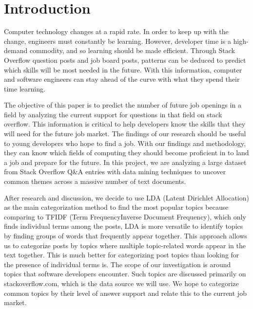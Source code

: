 \section{Introduction}

Computer technology changes at a rapid rate. In order to keep up with the change, engineers must constantly be learning. However, developer time is a high-demand commodity, and so learning should be made efficient. Through Stack Overflow question posts and job board posts, patterns can be deduced to predict which skills will be most needed in the future. With this information, computer and software engineers can stay ahead of the curve with what they spend their time learning. 

The objective of this paper is to predict the number of future job openings in a field by analyzing the current support for questions in that field on stack overflow. This information is critical to help developers know the skills that they will need for the future job market. The findings of our research should be useful to young developers who hope to find a job. With our findings and methodology, they can know which fields of computing they should become proficient in to land a job and prepare for the future. 
In this project, we are analyzing a large dataset from Stack Overflow Q\&A entries with data mining techniques to uncover common themes across a massive number of text documents.

After research and discussion, we decide to use LDA (Latent Dirichlet Allocation) as the main categorization method to find the most popular topics because comparing to TF\-IDF (Term Frequency\-Inverse Document Frequency), which only finds individual terms among the posts, LDA is more versatile to identify topics by finding groups of words that frequently appear together. This approach allows us to categorize posts by topics where multiple topic-related words appear in the text together. This is much better for categorizing post topics than looking for the presence of individual terms is.
The scope of our investigation is around topics that software developers encounter. Such topics are discussed primarily on stackoverflow.com, which is the data source we will use. We hope to categorize common topics by their level of answer support and relate this to the current job market.